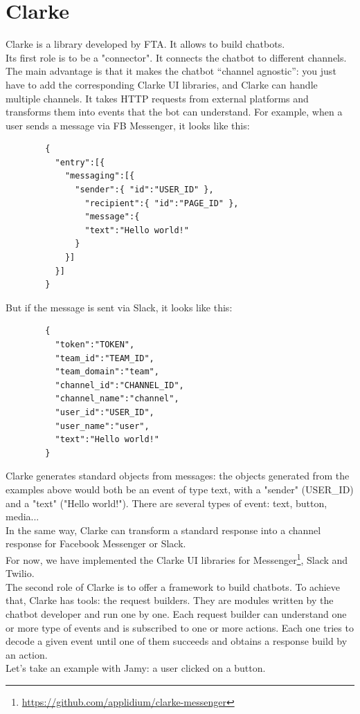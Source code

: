 \documentclass{article}
\begin{document}
\section{Clarke}
Clarke is a library developed by FTA. It allows to build chatbots.\\
\newline
Its first role is to be a "connector". It connects the chatbot to different channels. The main advantage is that it makes the chatbot “channel agnostic”: you just have to add the corresponding Clarke UI libraries, and Clarke can handle multiple channels. It takes HTTP requests from external platforms and transforms them into events that the bot can understand. For example, when a user sends a message via FB Messenger, it looks like this:
\begin{lstlisting}
        {
          "entry":[{
            "messaging":[{
              "sender":{ "id":"USER_ID" },    
                "recipient":{ "id":"PAGE_ID" },
                "message":{
                "text":"Hello world!"
              }
            }]
          }]
        }
\end{lstlisting}
But if the message is sent via Slack, it looks like this:
\begin{lstlisting}
        {
          "token":"TOKEN",
          "team_id":"TEAM_ID",
          "team_domain":"team",
          "channel_id":"CHANNEL_ID",
          "channel_name":"channel",
          "user_id":"USER_ID",
          "user_name":"user",
          "text":"Hello world!"
        }

\end{lstlisting}
Clarke generates standard objects from messages: the objects generated from the examples above would both be an event of type text, with a "sender" (USER\_ID) and a "text" ("Hello world!"). There are several types of event: text, button, media...\\
In the same way, Clarke can transform a standard response into a channel response for Facebook Messenger or Slack.\\
For now, we have implemented the Clarke UI libraries for Messenger\footnote{\url{https://github.com/applidium/clarke-messenger}}, Slack and Twilio.\\
\newline
The second role of Clarke is to offer a framework to build chatbots. To achieve that, Clarke has tools: the request builders. They are modules written by the chatbot developer and run one by one. Each request builder can understand one or more type of events and is subscribed to one or more actions. Each one tries to decode a given event until one of them succeeds and obtains a response build by an action.\\
Let's take an example with Jamy: a user clicked on a button.
\end{document}
